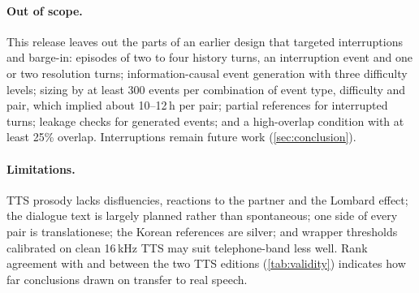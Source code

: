 \paragraph{Out of scope.}
This release leaves out the parts of an earlier design that targeted interruptions and barge-in: episodes of two to four history turns, an interruption event and one or two resolution turns; information-causal event generation with three difficulty levels; sizing by at least 300 events per combination of event type, difficulty and pair, which implied about 10--12\,h per pair; partial references for interrupted turns; leakage checks for generated events; and a high-overlap condition with at least 25\% overlap. Interruptions remain future work (\cref{sec:conclusion}).

\paragraph{Limitations.}
TTS prosody lacks disfluencies, reactions to the partner and the Lombard effect; the dialogue text is largely planned rather than spontaneous; one side of every pair is translationese; the Korean references are silver; and wrapper thresholds calibrated on clean 16\,kHz TTS may suit telephone-band \taxi less well. Rank agreement with \taxi and between the two TTS editions (\cref{tab:validity}) indicates how far conclusions drawn on \syn transfer to real speech.
